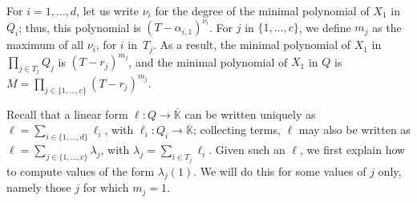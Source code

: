 \documentclass[12pt]{article}
\def\Kbar {{\ensuremath{\overline{\mathbb{K}}}}}
\begin{document}
For $i=1,\dots,d$, let us write $\nu_i$ for the degree of the minimal
polynomial of $X_1$ in $Q_i$; thus, this polynomial is
$(T-\alpha_{i,1})^{\nu_i}$. For $j$ in $\{1,\dots,c\}$, we define
$m_j$ as the maximum of all $\nu_i$, for $i$ in~$T_j$. As a result, the minimal
polynomial of $X_1$ in $\prod_{j \in T_j} Q_j$ is 
$(T-r_j)^{m_j}$, and the minimal polynomial of $X_1$ in $Q$ is
$M=\prod_{j \in \{1,\dots,c\}} (T-r_j)^{m_j}$.

Recall that a linear form $\ell: Q \to \Kbar$ can be written uniquely
as $\ell=\sum_{i\in \{1,\dots,d\}} \ell_i$, with $\ell_i:Q_i \to
\Kbar$; collecting terms, $\ell$ may also be written as $\ell=\sum_{j
	\in \{1,\dots,c\}} \lambda_j$, with $\lambda_j=\sum_{i \in T_j}
\ell_i$.  Given such an $\ell$, we first explain how to compute values
of the form $\lambda_j(1)$. We will do this for some values of $j$
only, namely those $j$ for which $m_j=1$.
\end{document}
